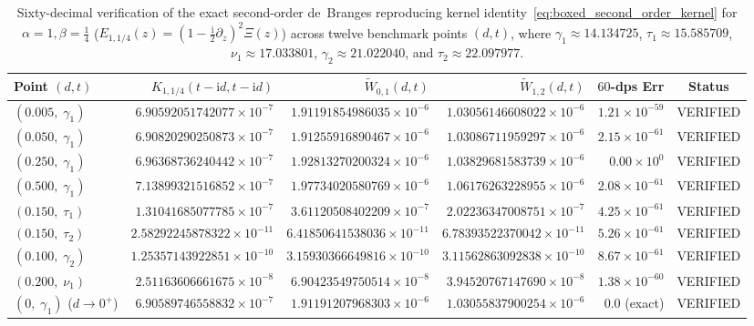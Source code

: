 \documentclass[11pt,reqno]{amsart}
\theoremstyle{definition}
\theoremstyle{remark}
\numberwithin{equation}{section}
\newcommand{\ii}{\mathrm{i}}
\begin{document}
\begin{table}[t]
\centering
\caption{Sixty-decimal verification of the exact second-order de~Branges reproducing kernel identity~\eqref{eq:boxed_second_order_kernel} for $\alpha = 1, \beta = \frac{1}{4}$ ($E_{1,1/4}(z) = (1 - \frac{\ii}{2}\partial_z)^2\Xi(z)$) across twelve benchmark points $(d,t)$, where $\gamma_1 \approx 14.134725$, $\tau_1 \approx 15.585709$, $\nu_1 \approx 17.033801$, $\gamma_2 \approx 21.022040$, and $\tau_2 \approx 22.097977$.}\label{tab:second_order_kernel}
\scriptsize
\setlength{\tabcolsep}{2.2pt}
\begin{tabular}{@{}lrrrrc@{}}
\toprule
Point $(d, t)$ & $K_{1,1/4}(t-\ii d, t-\ii d)$ & $\widetilde{W}_{0,1}(d,t)$ & $\widetilde{W}_{1,2}(d,t)$ & $60$-dps Err & Status \\
\midrule
$(0.005,\; \gamma_1)$ & $6.90592051742077\times 10^{-7}$  & $1.91191854986035\times 10^{-6}$  & $1.03056146608022\times 10^{-6}$  & $1.21\times 10^{-59}$ & VERIFIED \\
$(0.050,\; \gamma_1)$ & $6.90820290250873\times 10^{-7}$  & $1.91255916890467\times 10^{-6}$  & $1.03086711959297\times 10^{-6}$  & $2.15\times 10^{-61}$ & VERIFIED \\
$(0.250,\; \gamma_1)$ & $6.96368736240442\times 10^{-7}$  & $1.92813270200324\times 10^{-6}$  & $1.03829681583739\times 10^{-6}$  & $0.00\times 10^{0}$   & VERIFIED \\
$(0.500,\; \gamma_1)$ & $7.13899321516852\times 10^{-7}$  & $1.97734020580769\times 10^{-6}$  & $1.06176263228955\times 10^{-6}$  & $2.08\times 10^{-61}$ & VERIFIED \\
$(0.150,\; \tau_1)$   & $1.31041685077785\times 10^{-7}$  & $3.61120508402209\times 10^{-7}$  & $2.02236347008751\times 10^{-7}$  & $4.25\times 10^{-61}$ & VERIFIED \\
$(0.150,\; \tau_2)$   & $2.58292245878322\times 10^{-11}$ & $6.41850641538036\times 10^{-11}$ & $6.78393522370042\times 10^{-11}$ & $5.26\times 10^{-61}$ & VERIFIED \\
$(0.100,\; \gamma_2)$ & $1.25357143922851\times 10^{-10}$ & $3.15930366649816\times 10^{-10}$ & $3.11562863092838\times 10^{-10}$ & $8.67\times 10^{-61}$ & VERIFIED \\
$(0.200,\; \nu_1)$    & $2.51163606661675\times 10^{-8}$  & $6.90423549750514\times 10^{-8}$  & $3.94520767147690\times 10^{-8}$  & $1.38\times 10^{-60}$ & VERIFIED \\
$(0,\; \gamma_1)$ ($d\to 0^+$) & $6.90589746558832\times 10^{-7}$  & $1.91191207968303\times 10^{-6}$  & $1.03055837900254\times 10^{-6}$  & $0.0$ (exact) & VERIFIED \\

\end{tabular}
\end{table}
\end{document}
